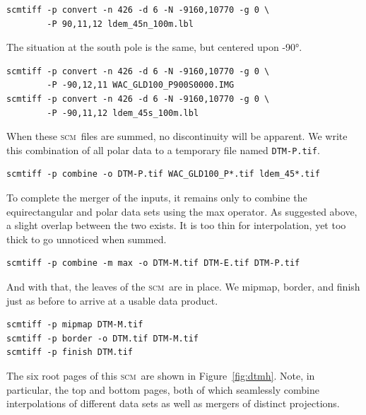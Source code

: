 \documentclass[oneside,10pt]{memoir}
\newcommand{\scm}     {\textsc{scm}}
\begin{document}
\begin{Spacing}{1.1}
\begin{Verbatim}
scmtiff -p convert -n 426 -d 6 -N -9160,10770 -g 0 \
        -P 90,11,12 ldem_45n_100m.lbl
\end{Verbatim}

The situation at the south pole is the same, but centered upon \ang{-90}.

\begin{Verbatim}
scmtiff -p convert -n 426 -d 6 -N -9160,10770 -g 0 \
        -P -90,12,11 WAC_GLD100_P900S0000.IMG
scmtiff -p convert -n 426 -d 6 -N -9160,10770 -g 0 \
        -P -90,11,12 ldem_45s_100m.lbl
\end{Verbatim}

When these \scm\ files are summed, no discontinuity will be apparent. We write this combination of all polar data to a temporary file named \texttt{DTM-P.tif}.

\begin{Verbatim}
scmtiff -p combine -o DTM-P.tif WAC_GLD100_P*.tif ldem_45*.tif
\end{Verbatim}

To complete the merger of the inputs, it remains only to combine the equirectangular and polar data sets using the max operator. As suggested above, a slight overlap between the two exists. It is too thin for interpolation, yet too thick to go unnoticed when summed.

\begin{Verbatim}
scmtiff -p combine -m max -o DTM-M.tif DTM-E.tif DTM-P.tif
\end{Verbatim}

And with that, the leaves of the \scm\ are in place. We mipmap, border, and finish just as before to arrive at a usable data product.

\begin{Verbatim}
scmtiff -p mipmap DTM-M.tif
scmtiff -p border -o DTM.tif DTM-M.tif
scmtiff -p finish DTM.tif
\end{Verbatim}

The six root pages of this \scm\ are shown in Figure~\ref{fig:dtmh}. Note, in particular, the top and bottom pages, both of which seamlessly combine interpolations of different data sets as well as mergers of distinct projections.


\end{Spacing}
\end{document}
